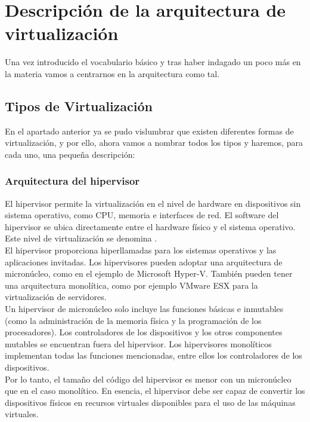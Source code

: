 \chapter{Descripción de la arquitectura de virtualización}

\lettrine[lines=1,slope=4pt,findent=0pt]{U}{}na vez introducido el vocabulario básico y tras haber indagado un poco más en la materia vamos a centrarnos en la arquitectura como tal.\\

\section{Tipos de Virtualización}
En el apartado anterior ya se pudo vislumbrar que existen diferentes formas de virtualización, y por ello, ahora vamos a nombrar todos los tipos y haremos, para cada uno, una pequeña descripción:

\subsection{Arquitectura del hipervisor}
El hipervisor permite la virtualización en el nivel de hardware en dispositivos sin sistema operativo, como CPU, memoria e interfaces de red. El software del hipervisor se ubica directamente entre el hardware físico y el sistema operativo. Este nivel de virtualización se denomina .\\

El hipervisor proporciona hiperllamadas para los sistemas operativos y las aplicaciones invitadas. Los hipervisores pueden adoptar una arquitectura de micronúcleo, como en el ejemplo de Microsoft Hyper-V. También pueden tener una arquitectura monolítica, como por ejemplo VMware ESX para la virtualización de servidores.\\

Un hipervisor de micronúcleo solo incluye las funciones básicas e inmutables (como la administración de la memoria física y la programación de los procesadores). Los controladores de los dispositivos y los otros componentes mutables se encuentran fuera del hipervisor. Los hipervisores monolíticos implementan todas las funciones mencionadas, entre ellos los controladores de los dispositivos.\\

Por lo tanto, el tamaño del código del hipervisor es menor con un micronúcleo que en el caso monolítico. En esencia, el hipervisor debe ser capaz de convertir los dispositivos físicos en recursos virtuales disponibles para el uso de las máquinas virtuales.

